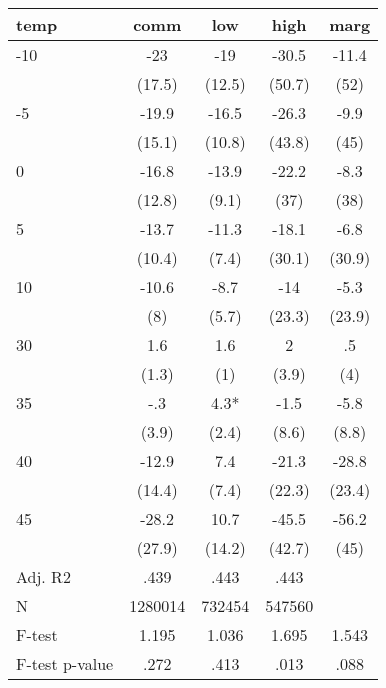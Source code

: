 \documentclass[]{article}
\begin{document}
\begin{tabular}{lcccc} \hline
temp & comm & low & high & marg \\ \hline
-10 & -23 & -19 & -30.5 & -11.4 \\
 & (17.5) & (12.5) & (50.7) & (52) \\
-5 & -19.9 & -16.5 & -26.3 & -9.9 \\
 & (15.1) & (10.8) & (43.8) & (45) \\
0 & -16.8 & -13.9 & -22.2 & -8.3 \\
 & (12.8) & (9.1) & (37) & (38) \\
5 & -13.7 & -11.3 & -18.1 & -6.8 \\
 & (10.4) & (7.4) & (30.1) & (30.9) \\
10 & -10.6 & -8.7 & -14 & -5.3 \\
 & (8) & (5.7) & (23.3) & (23.9) \\
30 & 1.6 & 1.6 & 2 & .5 \\
 & (1.3) & (1) & (3.9) & (4) \\
35 & -.3 & 4.3* & -1.5 & -5.8 \\
 & (3.9) & (2.4) & (8.6) & (8.8) \\
40 & -12.9 & 7.4 & -21.3 & -28.8 \\
 & (14.4) & (7.4) & (22.3) & (23.4) \\
45 & -28.2 & 10.7 & -45.5 & -56.2 \\
 & (27.9) & (14.2) & (42.7) & (45) \\
\hline Adj. R2 & .439 & .443 & .443 &  \\
N & 1280014 & 732454 & 547560 &  \\
F-test & 1.195 & 1.036 & 1.695 & 1.543 \\
 F-test p-value & .272 & .413 & .013 & .088 \\ \hline
\end{tabular}
\end{document}
